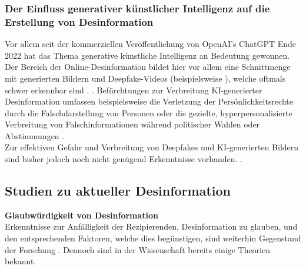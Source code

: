 \documentclass[12pt,a4paper]{article}        %
\begin{document}
\subsubsection{Der Einfluss generativer künstlicher Intelligenz auf die Erstellung von Desinformation}
Vor allem seit der kommerziellen Veröffentlichung von OpenAI’s ChatGPT Ende 2022 hat das Thema generative künstliche Intelligenz an Bedeutung gewonnen. Der Bereich der Online-Desinformation bildet hier vor allem eine Schnittmenge mit generierten Bildern und Deepfake-Videos (beispielsweise  \parencite[5]{birrer_what_2024}), welche oftmals schwer erkennbar sind \parencites[7]{montasari_artificial_2022}.  \parencite[4]{bontridder_role_2021}. Befürchtungen zur Verbreitung KI-generierter Desinformation umfassen beispielsweise die Verletzung der Persönlichkeitsrechte durch die Falschdarstellung von Personen oder die gezielte, hyperpersonalisierte Verbreitung von Falschinformationen während politischer Wahlen oder Abstimmungen \parencite[56, 64f]{kertysova_artificial_2018}.\\ 
Zur effektiven Gefahr und Verbreitung von Deepfakes und KI-generierten Bildern sind bisher jedoch noch nicht genügend Erkenntnisse vorhanden. \parencite{birrer_what_2024}.

\subsection{Studien zu aktueller Desinformation}


\textbf{Glaubwürdigkeit von Desinformation}\\
Erkenntnisse zur Anfälligkeit der Rezipierenden, Desinformation zu glauben, und den entsprechenden Faktoren, welche dies begünstigen, sind weiterhin Gegenstand der Forschung \parencites[1094]{lazer_science_2018}[486]{schaewitz_when_2020}. Dennoch sind in der Wissenschaft bereits einige Theorien bekannt.
\end{document}
